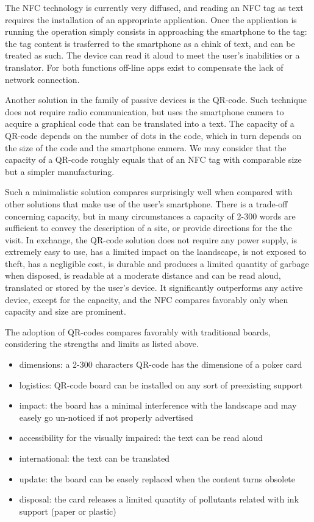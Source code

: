 \documentclass[sustainability,article,submit,pdftex,moreauthors]{Definitions/mdpi}
\begin{document}
The NFC technology is currently very diffused, and reading an NFC tag as text requires the installation of an appropriate application. Once the application is running the operation simply consists in approaching the smartphone to the tag: the tag content is trasferred to the smartphone as a chink of text, and can be treated as such. The device can read it aloud to meet the user's inabilities or a translator. For both functions off-line apps exist to compensate the lack of network connection.

Another solution in the family of passive devices is the QR-code. Such technique does not require radio communication, but uses the smartphone camera to acquire a graphical code that can be translated into a text. The capacity of a QR-code depends on the number of dots in the code, which in turn depends on the size of the code and the smartphone camera. We may consider that the capacity of a QR-code roughly equals that of an NFC tag with comparable size but a simpler manufacturing.

Such a minimalistic solution compares surprisingly well when compared with other solutions that make use of the user's smartphone. There is a trade-off concerning capacity, but in many circumstances a capacity of 2-300 words are sufficient to convey the description of a site, or provide directions for the the visit. In exchange, the QR-code solution does not require any power supply, is extremely easy to use, has a limited impact on the laandscape, is not exposed to theft, has a negligible cost, is durable and produces a limited quantity of garbage when disposed, is readable at a moderate distance and can be read aloud, translated or stored by the user's device. It significantly outperforms any active device, except for the capacity, and the NFC compares favorably only when capacity and size are prominent.  

The adoption of QR-codes compares favorably with traditional boards, considering the strengths and limits as listed above.

\begin{itemize}
\item dimensions: a 2-300 characters QR-code has the dimensione of a poker card
\item logistics: QR-code board can be installed on any sort of preexisting support
\item impact: the board has a minimal interference with the landscape and may easely go un-noticed if not properly advertised
\item accessibility for the visually impaired: the text can be read aloud
\item international: the text can be translated
\item update: the board can be easely replaced when the content turns obsolete
\item disposal: the card releases a limited quantity of pollutants related with ink support (paper or plastic)
\end{itemize}
\end{document}

